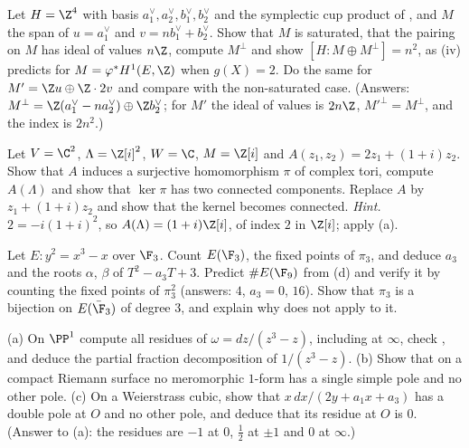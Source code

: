 \begin{exercise}\label{ex:curves:ex-gram}
Let $H=\Z^4$ with basis $a_1^\vee,a_2^\vee,b_1^\vee,b_2^\vee$ and the symplectic cup product of , and $M$ the span of $u=a_1^\vee$ and $v=nb_1^\vee+b_2^\vee$. Show
that $M$ is saturated, that the pairing on $M$ has ideal of values $n\Z$, compute $M^\perp$ and show $[H:M\oplus M^\perp]=n^2$, as (iv) predicts for
$M=\varphi^*H^1(E,\Z)$ when $g(X)=2$. Do the same for $M'=\Z u\oplus\Z\cdot2v$ and compare with the non-saturated case.
(Answers: $M^\perp=\Z(a_1^\vee-na_2^\vee)\oplus\Z b_2^\vee$; for $M'$ the ideal of values is $2n\Z$, $M'^\perp=M^\perp$, and the index is $2n^2$.)
\end{exercise}

\begin{exercise}\label{ex:curves:ex-component}
Let $V=\C^2$, $\Lambda=\Z[i]^2$, $W=\C$, $M=\Z[i]$ and $A(z_1,z_2)=2z_1+(1+i)z_2$. Show that $A$ induces a surjective homomorphism $\pi$ of complex tori, compute $A(\Lambda)$ and show that
$\ker\pi$ has two connected components. Replace $A$ by $z_1+(1+i)z_2$ and show that the kernel becomes connected.
\emph{Hint.} $2=-i(1+i)^2$, so $A(\Lambda)=(1+i)\Z[i]$, of index $2$ in $\Z[i]$; apply (a).
\end{exercise}

\begin{exercise}\label{ex:curves:ex-frobenius}
Let $E\colon y^2=x^3-x$ over $\F_3$. Count $E(\F_3)$, the fixed points of $\pi_3$, and deduce $a_3$ and the roots $\alpha$, $\beta$ of $T^2-a_3T+3$. Predict $\#E(\F_9)$ from
(d) and verify it by counting the fixed points of $\pi_3^2$ (answers: $4$, $a_3=0$, $16$). Show that $\pi_3$ is a bijection on $E(\bar\F_3)$ of degree $3$,
and explain why  does not apply to it.
\end{exercise}

\begin{exercise}\label{ex:curves:ex-residue}
(a) On $\PP^1$ compute all residues of $\omega=dz/(z^3-z)$, including at $\infty$, check , and deduce the partial fraction decomposition of $1/(z^3-z)$. (b) Show that on a
compact Riemann surface no meromorphic $1$-form has a single simple pole and no other pole. (c) On a Weierstrass cubic, show that $x\,dx/(2y+a_1x+a_3)$ has a double pole at $O$ and no other pole,
and deduce that its residue at $O$ is $0$. (Answer to (a): the residues are $-1$ at $0$, $\frac12$ at $\pm1$ and $0$ at $\infty$.)
\end{exercise}

